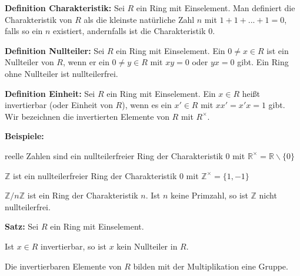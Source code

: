 \documentclass[11pt]{article}
\begin{document}
		\begin{mdframed}[backgroundcolor=blue!20]
			\textbf{Definition Charakteristik:} Sei $R$ ein Ring mit Einselement. Man definiert die Charakteristik von
			$R$ als die kleinste nat\"urliche Zahl $n$ mit $1+1+...+1=0$, falls so ein $n$ existiert, andernfalls
			ist die Charakteristik $0$.
		\end{mdframed}
		
		\begin{mdframed}[backgroundcolor=blue!20]
			\textbf{Definition Nullteiler:} Sei $R$ ein Ring mit Einselement. Ein $0 \neq x \in R$ ist ein Nullteiler von 
			$R$, wenn er ein $0 \neq y \in R$ mit $xy=0$ oder $yx=0$ gibt. Ein Ring ohne Nullteiler ist
			nullteilerfrei.
		\end{mdframed}
		
		\begin{mdframed}[backgroundcolor=blue!20]
			\textbf{Definition Einheit:} Sei $R$ ein Ring mit Einselement. Ein $x \in R$ hei{\ss}t invertierbar (oder
			 Einheit von $R$), wenn es ein $x' \in R$ mit $xx'=x'x=1$ gibt. Wir bezeichnen die invertierten
			 Elemente von $R$ mit $R^{\times}$.
		\end{mdframed}
		
		\textbf{Beispiele:}\\
		\begin{compactitem}
			\item reelle Zahlen sind ein nullteilerfreier Ring der Charakteristik $0$ mit $\mathbb R^{\times}=
			\mathbb R\backslash\{0\}$
			\item $\mathbb Z$ ist ein nullteilerfreier Ring der Charakteristik $0$ mit $\mathbb Z^{\times}=
			\{1,-1\}$
			\item $\mathbb Z/n \mathbb Z$ ist ein Ring der Charakteristik $n$. Ist $n$ keine Primzahl, so
			ist $\mathbb Z$ nicht nullteilerfrei.
		\end{compactitem}
		
		\begin{framed}
			\textbf{Satz:} Sei $R$ ein Ring mit Einselement. 
			\begin{compactitem}
				\item Ist $x \in R$ invertierbar, so ist $x$ kein Nullteiler in $R$.
				\item Die invertierbaren Elemente von $R$ bilden mit der Multiplikation eine Gruppe.
			\end{compactitem}
		\end{framed}
		
\end{document}
